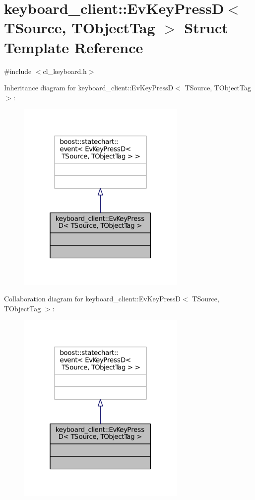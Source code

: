 \hypertarget{structkeyboard__client_1_1EvKeyPressD}{}\section{keyboard\+\_\+client\+:\+:Ev\+Key\+PressD$<$ T\+Source, T\+Object\+Tag $>$ Struct Template Reference}
\label{structkeyboard__client_1_1EvKeyPressD}


{\ttfamily \#include $<$cl\+\_\+keyboard.\+h$>$}



Inheritance diagram for keyboard\+\_\+client\+:\+:Ev\+Key\+PressD$<$ T\+Source, T\+Object\+Tag $>$\+:
\nopagebreak
\begin{figure}[H]
\begin{center}
\leavevmode
\includegraphics[width=232pt]{structkeyboard__client_1_1EvKeyPressD__inherit__graph}
\end{center}
\end{figure}


Collaboration diagram for keyboard\+\_\+client\+:\+:Ev\+Key\+PressD$<$ T\+Source, T\+Object\+Tag $>$\+:
\nopagebreak
\begin{figure}[H]
\begin{center}
\leavevmode
\includegraphics[width=232pt]{structkeyboard__client_1_1EvKeyPressD__coll__graph}
\end{center}
\end{figure}


